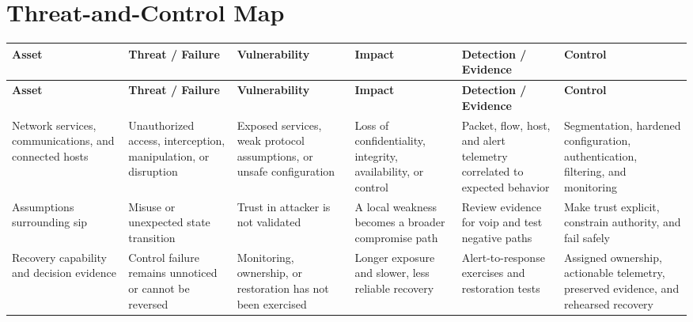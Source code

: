 \documentclass[11pt,letterpaper]{article}
\begin{document}
\section*{Threat-and-Control Map}
\begingroup\scriptsize\setlength{\tabcolsep}{2pt}
\begin{longtable}{>{\raggedright\arraybackslash}p{}>{\raggedright\arraybackslash}p{}>{\raggedright\arraybackslash}p{}>{\raggedright\arraybackslash}p{}>{\raggedright\arraybackslash}p{}>{\raggedright\arraybackslash}p{}}
\toprule\rowcolor{Navy}\color{white}\textbf{Asset} & \color{white}\textbf{Threat / Failure} & \color{white}\textbf{Vulnerability} & \color{white}\textbf{Impact} & \color{white}\textbf{Detection / Evidence} & \color{white}\textbf{Control}\\\midrule
\endfirsthead
\toprule\rowcolor{Navy}\color{white}\textbf{Asset} & \color{white}\textbf{Threat / Failure} & \color{white}\textbf{Vulnerability} & \color{white}\textbf{Impact} & \color{white}\textbf{Detection / Evidence} & \color{white}\textbf{Control}\\\midrule
\endhead
Network services, communications, and connected hosts & Unauthorized access, interception, manipulation, or disruption & Exposed services, weak protocol assumptions, or unsafe configuration & Loss of confidentiality, integrity, availability, or control & Packet, flow, host, and alert telemetry correlated to expected behavior & Segmentation, hardened configuration, authentication, filtering, and monitoring\\\midrule
Assumptions surrounding sip & Misuse or unexpected state transition & Trust in attacker is not validated & A local weakness becomes a broader compromise path & Review evidence for voip and test negative paths & Make trust explicit, constrain authority, and fail safely\\\midrule
Recovery capability and decision evidence & Control failure remains unnoticed or cannot be reversed & Monitoring, ownership, or restoration has not been exercised & Longer exposure and slower, less reliable recovery & Alert-to-response exercises and restoration tests & Assigned ownership, actionable telemetry, preserved evidence, and rehearsed recovery\\\midrule
\bottomrule
\end{longtable}
\endgroup
\end{document}
